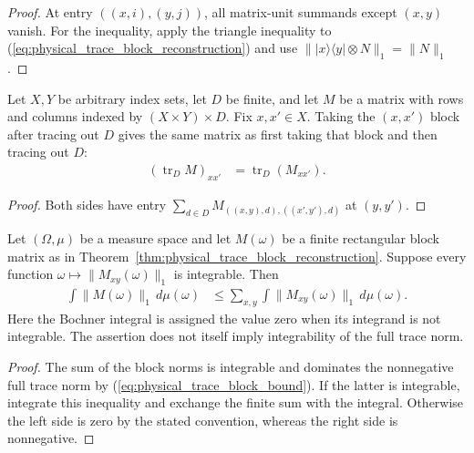 \begin{proof}\leanok
    At entry $((x,i),(y,j))$, all matrix-unit summands except $(x,y)$ vanish.
    For the inequality, apply the triangle inequality to
    (\ref{eq:physical_trace_block_reconstruction}) and use
    $\||x\rangle\langle y|\otimes N\|_1=\|N\|_1$.
\end{proof}

\begin{theorem}
    \label{thm:physical_trace_blocks}
    \leanok
    Let $X,Y$ be arbitrary index sets, let $D$ be finite, and let $M$ be
    a matrix with rows and columns indexed by $(X\times Y)\times D$.
    Fix $x,x'\in X$. Taking the $(x,x')$ block after tracing out $D$
    gives the same matrix as first taking that block and then tracing out $D$:
    \begin{align}
        (\operatorname{tr}_D M)_{xx'}
         & =\operatorname{tr}_D(M_{xx'}).
    \end{align}
\end{theorem}

\begin{proof}\leanok
    Both sides have entry
    $\sum_{d\in D}M_{((x,y),d),((x',y'),d)}$ at $(y,y')$.
\end{proof}

\begin{theorem}
    \label{thm:physical_trace_integral_blocks}
    \leanok
    Let $(\Omega,\mu)$ be a measure space and let
    $M(\omega)$ be a finite rectangular block matrix as in
    Theorem~\ref{thm:physical_trace_block_reconstruction}.
    Suppose every function $\omega\mapsto\|M_{xy}(\omega)\|_1$ is integrable.
    Then
    \begin{align}
        \int\|M(\omega)\|_1\,d\mu(\omega)
         & \leq\sum_{x,y}\int\|M_{xy}(\omega)\|_1\,d\mu(\omega).
        \label{eq:physical_trace_integral_blocks}
    \end{align}
    Here the Bochner integral is assigned the value zero when its integrand
    is not integrable. The assertion does not itself imply integrability
    of the full trace norm.
\end{theorem}

\begin{proof}\leanok
    The sum of the block norms is integrable and dominates the nonnegative
    full trace norm by (\ref{eq:physical_trace_block_bound}). If the latter
    is integrable, integrate this inequality and exchange the finite sum
    with the integral. Otherwise the left side is zero by the stated
    convention, whereas the right side is nonnegative.
\end{proof}

